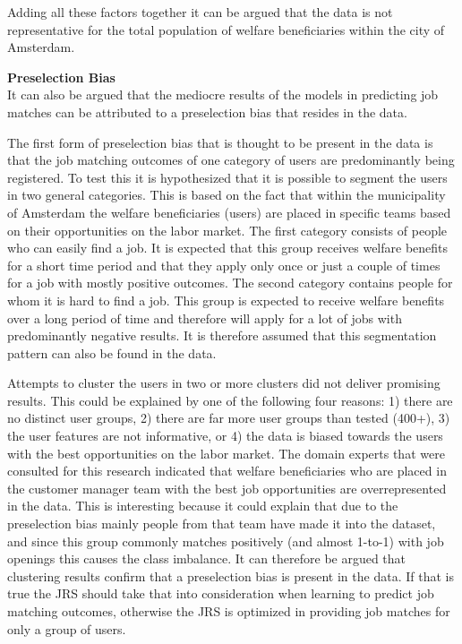 Adding all these factors together it can be argued that the data is not representative for the total population of welfare beneficiaries within the city of Amsterdam. 

\noindent
\textbf{Preselection Bias} \\
It can also be argued that the mediocre results of the models in predicting job matches can be attributed to a preselection bias that resides in the data. 

The first form of preselection bias that is thought to be present in the data is that the job matching outcomes of one category of users are predominantly being registered.
To test this it is hypothesized that it is possible to segment the users in two general categories.
This is based on the fact that within the municipality of Amsterdam the welfare beneficiaries (users) are placed in specific teams based on their opportunities on the labor market. 
The first category consists of people who can easily find a job. 
It is expected that this group receives welfare benefits for a short time period and that they apply only once or just a couple of times for a job with mostly positive outcomes. 
The second category contains people for whom it is hard to find a job. 
This group is expected to receive welfare benefits over a long period of time and therefore will apply for a lot of jobs with predominantly negative results.
It is therefore assumed that this segmentation pattern can also be found in the data.

Attempts to cluster the users in two or more clusters did not deliver promising results.
This could be explained by one of the following four reasons: 1) there are no distinct user groups, 2) there are far more user groups than tested (400+), 3) the user features are not informative, or 4) the data is biased towards the users with the best opportunities on the labor market.
The domain experts that were consulted for this research indicated that welfare beneficiaries who are placed in the customer manager team with the best job opportunities are overrepresented in the data.  
This is interesting because it could explain that due to the preselection bias mainly people from that team have made it into the dataset, and since this group commonly matches positively (and almost 1-to-1) with job openings this causes the class imbalance.
It can therefore be argued that clustering results confirm that a preselection bias is present in the data. 
If that is true the JRS should take that into consideration when learning to predict job matching outcomes, otherwise the JRS is optimized in providing job matches for only a group of users.

